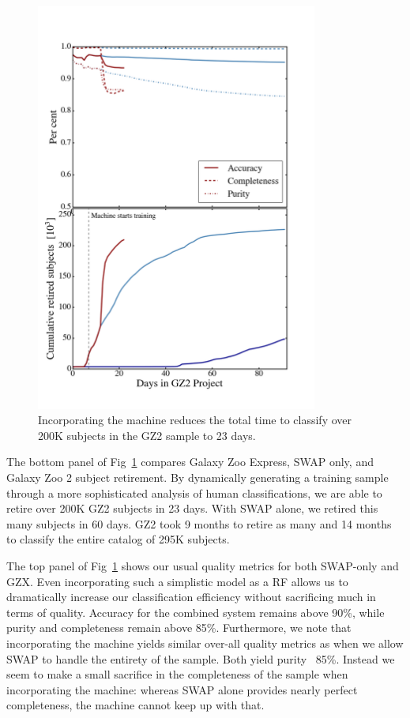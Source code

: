 \documentclass[twocolumn]{aastex6}
\begin{document}
\begin{figure}[t!]
\includegraphics[width=3.65in]{figures/moneyplot.png}
\caption{Incorporating the machine reduces the total time to classify over 200K subjects in the GZ2 sample to 23 days. \label{fig: money}}
\end{figure}

The bottom panel of Fig~\ref{fig: money} compares  Galaxy Zoo Express, 
SWAP only, and Galaxy Zoo 2 subject retirement.
By dynamically generating a training sample
through a more sophisticated analysis of human classifications, we are able
to retire over 200K GZ2 subjects in 23 days.  With SWAP alone, we retired this
many subjects in 60 days. GZ2 took 9 months to retire as many and 14 months 
to classify the entire catalog of 295K subjects. 

The top panel of Fig~\ref{fig: money} shows our usual quality metrics for both 
SWAP-only and GZX.  Even incorporating such a simplistic model as a RF allows
us to dramatically increase our classification efficiency without sacrificing much 
in terms of quality. Accuracy for the combined system remains above 90\%, while
purity and completeness remain above 85\%. Furthermore, we note that 
incorporating the machine yields similar over-all quality metrics as when we 
allow SWAP to handle the entirety of the sample. Both yield purity ~85\%. 
Instead we seem to make a small sacrifice in the completeness of the sample
when incorporating the machine: whereas SWAP alone provides nearly perfect
completeness, the machine cannot keep up with that.
\end{document}
